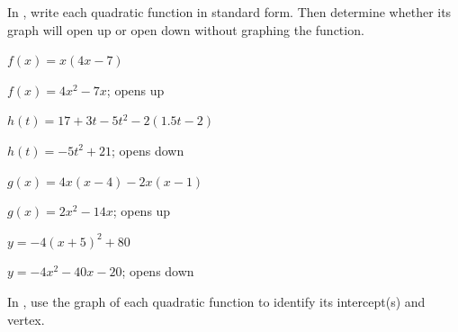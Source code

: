 

In , write each quadratic function in standard form. Then determine whether its graph will open up or open down without graphing the function.


\begin{exercise}\label{exercise-3.1.1}
$f(x)=x(4x-7)$
\end{exercise}

\begin{solution}
    $f(x)=4x^2-7x$; opens up
\end{solution}





\begin{exercise}
$h(t)=17+3t-5t^2-2(1.5t-2)$
\end{exercise}

\begin{solution}
    $h(t)=-5t^2+21$; opens down
\end{solution}





\begin{exercise}
$g(x)=4x(x-4)-2x(x-1)$
\end{exercise}

\begin{solution}
    $g(x)=2x^2-14x$; opens up
\end{solution}





\begin{exercise}\label{exercise-3.1.4}
$y=-4(x+5)^2+80$
\end{exercise}

\begin{solution}
     $y=-4x^2-40x-20$; opens down
\end{solution}






\noindent In , use the graph of each quadratic function to identify its intercept(s) and vertex.

\begin{exercise}\label{exercise-3.1.5}

\begin{center}
\end{center}
\end{exercise}

